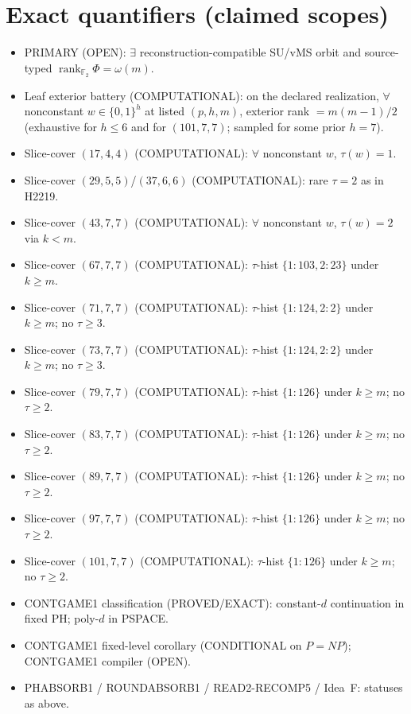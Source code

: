 \documentclass[11pt]{article}
\begin{document}
\section*{Exact quantifiers (claimed scopes)}
\begin{itemize}
\item PRIMARY (OPEN): $\exists$ reconstruction-compatible SU/vMS orbit and source-typed
  $\operatorname{rank}_{\mathbb F_2}\Phi=\omega(m)$.
\item Leaf exterior battery (COMPUTATIONAL): on the declared realization, $\forall$ nonconstant
  $w\in\{0,1\}^h$ at listed $(p,h,m)$, exterior rank $=m(m-1)/2$
  (exhaustive for $h\le6$ and for $(101,7,7)$; sampled for some prior $h{=}7$).
\item Slice-cover $(17,4,4)$ (COMPUTATIONAL): $\forall$ nonconstant $w$, $\tau(w)=1$.
\item Slice-cover $(29,5,5)$/$(37,6,6)$ (COMPUTATIONAL): rare $\tau{=}2$ as in H2219.
\item Slice-cover $(43,7,7)$ (COMPUTATIONAL): $\forall$ nonconstant $w$, $\tau(w)=2$ via $k{<}m$.
\item Slice-cover $(67,7,7)$ (COMPUTATIONAL): $\tau$-hist $\{1{:}103,2{:}23\}$ under $k{\ge}m$.
\item Slice-cover $(71,7,7)$ (COMPUTATIONAL): $\tau$-hist $\{1{:}124,2{:}2\}$ under $k{\ge}m$;
  no $\tau{\ge}3$.
\item Slice-cover $(73,7,7)$ (COMPUTATIONAL): $\tau$-hist $\{1{:}124,2{:}2\}$ under $k{\ge}m$;
  no $\tau{\ge}3$.
\item Slice-cover $(79,7,7)$ (COMPUTATIONAL): $\tau$-hist $\{1{:}126\}$ under $k{\ge}m$;
  no $\tau{\ge}2$.
\item Slice-cover $(83,7,7)$ (COMPUTATIONAL): $\tau$-hist $\{1{:}126\}$ under $k{\ge}m$;
  no $\tau{\ge}2$.
\item Slice-cover $(89,7,7)$ (COMPUTATIONAL): $\tau$-hist $\{1{:}126\}$ under $k{\ge}m$;
  no $\tau{\ge}2$.
\item Slice-cover $(97,7,7)$ (COMPUTATIONAL): $\tau$-hist $\{1{:}126\}$ under $k{\ge}m$;
  no $\tau{\ge}2$.
\item Slice-cover $(101,7,7)$ (COMPUTATIONAL): $\tau$-hist $\{1{:}126\}$ under $k{\ge}m$;
  no $\tau{\ge}2$.
\item CONTGAME1 classification (PROVED/EXACT): constant-$d$ continuation in fixed PH;
  poly-$d$ in PSPACE.
\item CONTGAME1 fixed-level corollary (CONDITIONAL on $P=NP$); CONTGAME1 compiler (OPEN).
\item PHABSORB1 / ROUNDABSORB1 / READ2-RECOMP5 / Idea~F: statuses as above.
\end{itemize}
\end{document}
